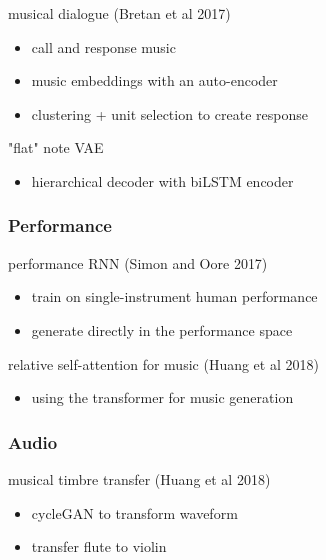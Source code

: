 \documentclass[]{article}
\theoremstyle{definition}
\begin{document}
    musical dialogue (Bretan et al 2017)
    \begin{itemize}
        \item call and response music
        \item music embeddings with an auto-encoder
        \item clustering + unit selection to create response
    \end{itemize}

    "flat" note VAE
    \begin{itemize}
        \item hierarchical decoder with biLSTM encoder
    \end{itemize}

    \subsubsection{Performance}%
    \label{ssub:performance}

    performance RNN (Simon and Oore 2017)
    \begin{itemize}
        \item train on single-instrument human performance
        \item generate directly in the performance space
    \end{itemize}


    relative self-attention for music (Huang et al 2018)
    \begin{itemize}
        \item using the transformer for music generation
    \end{itemize}

    \subsubsection{Audio}%
    \label{ssub:audio}

    musical timbre transfer (Huang et al 2018)
    \begin{itemize}
        \item cycleGAN to transform waveform
        \item transfer flute to violin
    \end{itemize}
\end{document}
